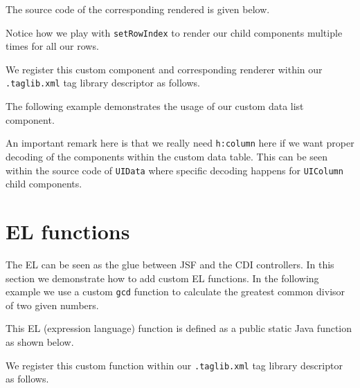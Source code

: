 The source code of the corresponding rendered is given below.

Notice how we play with \texttt{setRowIndex} to render our child components multiple times for all our rows.

We register this custom component and corresponding renderer within our \texttt{.taglib.xml} tag library descriptor as follows.


The following example demonstrates the usage of our custom data list component.

An important remark here is that we really need \texttt{h:column} here if we want proper decoding of the components within the custom data table.
This can be seen within the source code of \texttt{UIData} where specific decoding happens for \texttt{UIColumn} child components.


\section{EL functions}
The EL can be seen as the glue between JSF and the CDI controllers.
In this section we demonstrate how to add custom EL functions.
In the following example we use a custom \texttt{gcd} function to calculate the greatest common divisor of two given numbers.


This EL (expression language) function is defined as a public static Java function as shown below.


We register this custom function within our \texttt{.taglib.xml} tag library descriptor as follows.

